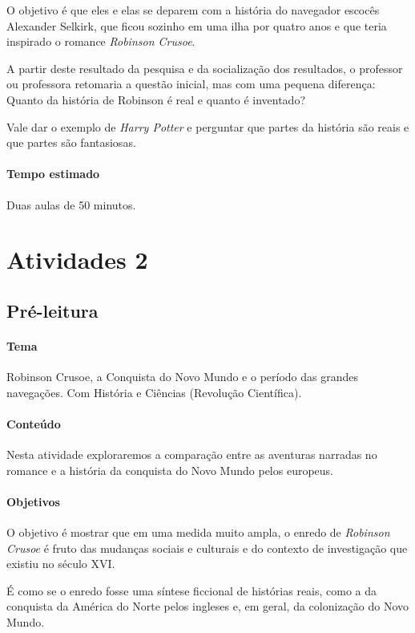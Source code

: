 \documentclass{article}
\begin{document}
O objetivo é que eles e elas se deparem com a história do navegador
escocês Alexander Selkirk, que ficou sozinho em uma ilha por quatro anos
e que teria inspirado o romance \emph{Robinson Crusoe}.

A partir deste resultado da pesquisa e da socialização dos resultados, o
professor ou professora retomaria a questão inicial, mas com uma pequena
diferença: Quanto da história de Robinson é real e quanto é inventado?

Vale dar o exemplo de \emph{Harry Potter} e perguntar que partes da
história são reais e que partes são fantasiosas.

\paragraph{Tempo estimado} Duas aulas de 50 minutos.

\section{Atividades 2}

\subsection{Pré-leitura}

\paragraph{Tema} Robinson Crusoe, a Conquista do Novo Mundo e o período das
grandes navegações. Com História e Ciências (Revolução Científica).


\paragraph{Conteúdo}
Nesta atividade exploraremos a comparação entre as aventuras narradas no
romance e a história da conquista do Novo Mundo pelos europeus.

\paragraph{Objetivos}
O objetivo é mostrar que em uma medida muito ampla, o enredo de
\emph{Robinson Crusoe} é fruto das mudanças sociais e culturais e do
contexto de investigação que existiu no século XVI.

É como se o enredo fosse uma síntese ficcional de histórias reais, como
a da conquista da América do Norte pelos ingleses e, em geral, da
colonização do Novo Mundo.
\end{document}
